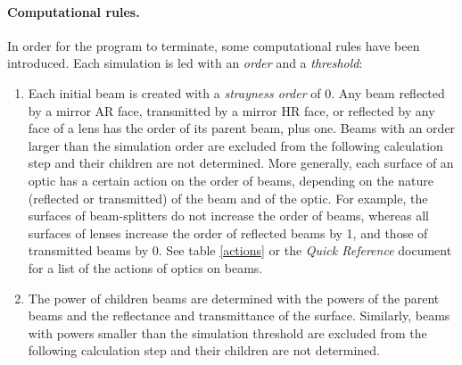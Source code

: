 \documentclass{article}
\begin{document}

\paragraph{Computational rules.}In order for the program to terminate, some computational rules have been introduced. Each simulation is led with an \textit{order} and a \textit{threshold}:

\begin{enumerate}
\item Each initial beam is created with a \textit{strayness order} of 0. Any beam reflected by a mirror AR face, transmitted by a mirror HR face, or reflected by any face of a lens has the order of its parent beam, plus one. Beams with an order larger than the simulation order are excluded from the following calculation step and their children are not determined. More generally, each surface of an optic has a certain action on the order of beams, depending on the nature (reflected or transmitted) of the beam and of the optic. For example, the surfaces of beam-splitters do not increase the order of beams, whereas all surfaces of lenses increase the order of reflected beams by 1, and those of transmitted beams by 0. See table \ref{actions} or the \textit{Quick Reference} document for a list of the actions of optics on beams.

\item The power of children beams are determined with the powers of the parent beams and the reflectance and transmittance of the surface. Similarly, beams with powers smaller than the simulation threshold are excluded from the following calculation step and their children are not determined.

\end{enumerate}
\end{document}
